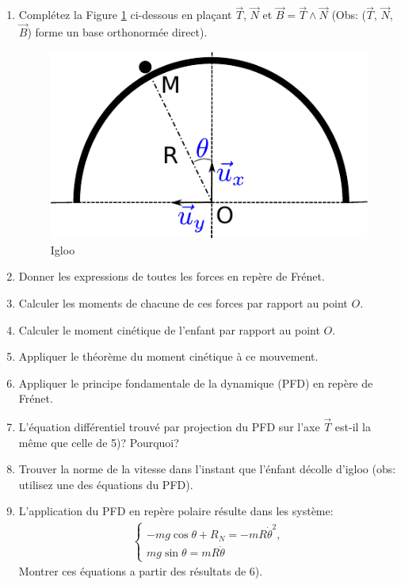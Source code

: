 \documentclass[french,10pt]{article}
\begin{document}
	\begin{enumerate}
	\item Complétez la Figure \ref{fig:igloo} ci-dessous en plaçant $\vec{T}$, $\vec{N}$ et $\vec{B}=\vec{T}\wedge \vec{N}$ (Obs: ($\vec{T}$, $\vec{N}$, $\vec{B}$) forme un base orthonormée direct).
	\begin{figure}[h!]
		\centering
		\includegraphics[width=0.4\linewidth]{igloo}
		\caption{Igloo}
		\label{fig:igloo}
	\end{figure}

 	\FloatBarrier
	\item Donner les expressions de toutes les forces en repère de Frénet.
	\item Calculer les moments de chacune de ces forces par rapport au point $O$.
	\item Calculer le moment cinétique de l'enfant par rapport au point $O$.
	\item Appliquer le théorème du moment cinétique à ce mouvement.
	\item Appliquer le principe fondamentale de la dynamique (PFD) en repère de Frénet.
	\item L'équation différentiel trouvé par projection du PFD sur l'axe $\vec{T}$ est-il la même que celle de 5)? Pourquoi? 
	\item Trouver la norme de la vitesse dans l'instant que l'énfant décolle d'igloo (obs: utilisez une des équations du PFD).
	\item L'application du PFD en repère polaire résulte dans les système:
	\begin{align}
		\begin{cases}
			-m g \cos \theta + R_N = -m R \dot{\theta}^2 , \\
			m g \sin \theta = m R \ddot{\theta}
		\end{cases}
	\end{align}
 	Montrer ces équations a partir des résultats de 6).
\end{enumerate}
\end{document}
